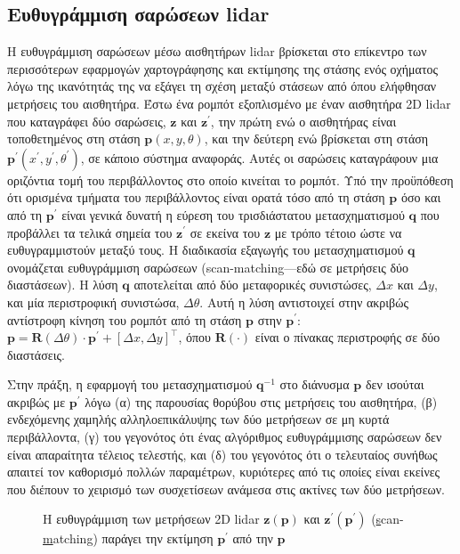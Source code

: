 \subsection{Ευθυγράμμιση σαρώσεων lidar}

Η ευθυγράμμιση σαρώσεων μέσω αισθητήρων lidar βρίσκεται στο επίκεντρο
των περισσότερων εφαρμογών χαρτογράφησης και εκτίμησης
της στάσης ενός οχήματος λόγω της ικανότητάς της να εξάγει τη σχέση μεταξύ
στάσεων από όπου ελήφθησαν μετρήσεις του αισθητήρα. Έστω ένα ρομπότ εξοπλισμένο
με έναν αισθητήρα 2D lidar που καταγράφει δύο σαρώσεις, $\bm{z}$ και
$\bm{z^{\prime}}$, την πρώτη ενώ ο αισθητήρας είναι τοποθετημένος στη στάση
$\bm{p}(x,y,\theta)$, και την δεύτερη ενώ βρίσκεται στη στάση
$\bm{p}^{\prime}(x^{\prime},y^{\prime},\theta^{\prime})$, σε κάποιο σύστημα
αναφοράς. Αυτές οι σαρώσεις καταγράφουν μια οριζόντια τομή του περιβάλλοντος
στο οποίο κινείται το ρομπότ. Υπό την προϋπόθεση ότι ορισμένα τμήματα του
περιβάλλοντος είναι ορατά τόσο από τη στάση $\bm{p}$ όσο και από τη
$\bm{p}^{\prime}$ είναι γενικά δυνατή η εύρεση του τρισδιάστατου
μετασχηματισμού $\bm{q}$ που προβάλλει τα τελικά σημεία του $\bm{z}^{\prime}$
σε εκείνα του $\bm{z}$ με τρόπο τέτοιο ώστε να ευθυγραμμιστούν μεταξύ τους. Η
διαδικασία εξαγωγής του μετασχηματισμού $\bm{q}$ ονομάζεται ευθυγράμμιση
σαρώσεων (scan-matching---εδώ σε μετρήσεις δύο διαστάσεων). Η λύση $\bm{q}$
αποτελείται από δύο μεταφορικές συνιστώσες, $\Delta x$ και $\Delta y$, και μία
περιστροφική συνιστώσα, $\Delta\theta$. Αυτή η λύση αντιστοιχεί στην ακριβώς
αντίστροφη κίνηση του ρομπότ από τη στάση $\bm{p}$ στην $\bm{p}^{\prime}$:
$\bm{p} = \bm{R}(\Delta\theta) \cdot \bm{p}^{\prime} + [\Delta x, \Delta
y]^{\top}$, όπου $\bm{R}(\cdot)$ είναι ο πίνακας περιστροφής σε δύο διαστάσεις.

Στην πράξη, η εφαρμογή του μετασχηματισμού $\bm{q}^{-1}$ στο διάνυσμα
$\bm{p}$ δεν ισούται ακριβώς με $\bm{p}^\prime$ λόγω (α) της παρουσίας θορύβου
στις μετρήσεις του αισθητήρα, (β) ενδεχόμενης χαμηλής αλληλοεπικάλυψης των δύο
μετρήσεων σε μη κυρτά περιβάλλοντα, (γ) του γεγονότος ότι ένας αλγόριθμος
ευθυγράμμισης σαρώσεων δεν είναι απαραίτητα τέλειος τελεστής, και (δ) του
γεγονότος ότι ο τελευταίος συνήθως απαιτεί τον καθορισμό πολλών παραμέτρων,
κυριότερες από τις οποίες είναι εκείνες που διέπουν το χειρισμό των συσχετίσεων
ανάμεσα στις ακτίνες των δύο μετρήσεων.

\begin{figure}[htbp]\centering
  
  \vspace{0.5cm}
  \caption{\small Η ευθυγράμμιση των μετρήσεων 2D lidar $\bm{z}(\bm{p})$ και
           $\bm{z}^\prime(\bm{p}^\prime)$ (\underline{s}can-\underline{m}atching)
           παράγει την εκτίμηση $\bm{p}^\prime$ από την $\bm{p}$}
  \label{fig:sm_principle}
\end{figure}


